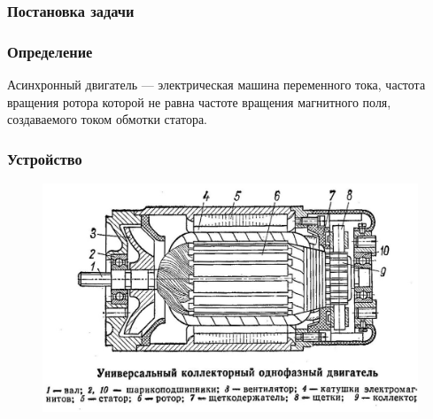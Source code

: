 \documentclass[14pt]{beamer}
\author{\small{%
Тема нашей презентации\\%
\vspace{50pt}
\emph{Выступающиe:}~П. С. Анашкевич, Р. И. Будный\\%
\emph{Руководитель:}~проф.,~к.ф.-м.н.~В.В.Цегельник}
\vspace{30pt}
}
\date{\small{Минск, 2013}}
\begin{document}
\maketitle



\begin{frame}
\frametitle{Постановка задачи}



\end{frame}



\begin{frame}

\frametitle{Определение}

Асинхронный двигатель --- электрическая машина переменного тока, частота вращения ротора которой не равна частоте вращения магнитного поля, создаваемого током обмотки статора.


\end{frame}


\begin{frame}
\frametitle{Устройство}

\begin{figure}[H]
  \center
  \includegraphics[width=0.8\linewidth]{konstrukciya-1}
\end{figure}

\end{frame}
\end{document}
